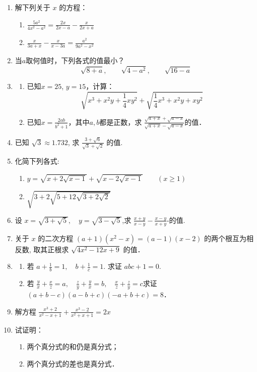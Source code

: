 \begin{enumerate}
\item 解下列关于 $x$ 的方程：
\begin{enumerate}
\item $\frac{5 a^{2}}{4 x^{2}-a^{2}}=\frac{2 x}{2 x-a}-\frac{x}{2 x+a}$
\item $\frac{x}{3 a+x}-\frac{x}{x-3 a}=\frac{a^{2}}{9 a^{2}-x^{2}}$
\end{enumerate}

\item 当$a$取何值时，下列各式的值最小？
\[\sqrt{8+a},\qquad \sqrt{4-a^2},\qquad \sqrt{16-a}  \]

\item \begin{enumerate}
    \item 已知$x=25$, $y=15$，计算：
    \[\sqrt{x^3+x^2y+\frac{1}{4}xy^2}+\sqrt{\frac{1}{4}x^3+x^2y+xy^2} \]
    \item 已知$x=\frac{2ab}{b^2+1}$，其中$a,b$都是正数，求 $\frac{\sqrt{a+x}+\sqrt{a-x}}{\sqrt{a+x}-\sqrt{a-x}}$的值．
\end{enumerate}

\item 已知 $\sqrt{3} \approx 1.732$, 求 $\frac{3+\sqrt{6}}{\sqrt{3}+\sqrt{2}}$ 的值.
\item 化简下列各式:
\begin{enumerate}
    \item $y=\sqrt{x+2 \sqrt{x-1}}+\sqrt{x-2 \sqrt{x-1}}\qquad (x \geqslant 1)$
    \item $\sqrt{3+2 \sqrt{5+12 \sqrt{3+2 \sqrt{2}}}}$
\end{enumerate}

\item 设 $x=\sqrt{3+\sqrt{5}},\quad  y=\sqrt{3-\sqrt{5}}$,求 $\frac{x+y}{x-y}-\frac{x-y}{x+y}$-的值.
\item 关于 $x$ 的二次方程 $(a+1)\left(x^{2}-x\right)=(a-1)(x-2)$
的两个根互为相反数, 取其正根求 $\sqrt{4 x^{2}-12 x+9}$ 的值．
\item 
\begin{enumerate}
    \item 若 $a+\frac{1}{b}=1, \quad b+\frac{1}{c}=1$. 求证 $a b c+1=0$.
    \item 若 $\frac{y}{x}+\frac{x}{z}=a,\quad  \frac{z}{y}+\frac{y}{x}=b,\quad  \frac{x}{z}+\frac{z}{y}=c$求证 $(a+b-c)(a-b+c)(-a+b+c)=8$．
\end{enumerate}


\item 解方程 $\frac{x^{3}+2}{x^{2}-x+1}+\frac{x^{3}-2}{x^{2}+x+1}=2 x$
\item 试证明：
\begin{enumerate}
    \item 两个真分式的和仍是真分式；
    \item 两个真分式的差也是真分式．
\end{enumerate}

\end{enumerate}


